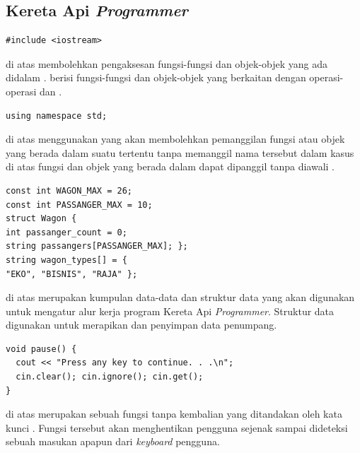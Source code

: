 \documentclass[../main.tex]{subfiles}
\begin{document}
\subsection{Kereta Api \textit{Programmer}}

\begin{code}
\begin{verbatim}
#include <iostream>
\end{verbatim}
\end{code}

{\Script} di atas membolehkan pengaksesan fungsi-fungsi dan objek-objek yang ada didalam {\header} {\file} . {\Header} {\file}  berisi fungsi-fungsi dan objek-objek yang berkaitan dengan operasi-operasi {\ioi} dan {\ioo} {\stream}.

\begin{code}
\begin{verbatim}
using namespace std;
\end{verbatim}
\end{code}

{\Script} di atas menggunakan {\statement}  yang akan membolehkan pemanggilan fungsi atau objek yang berada dalam suatu  tertentu tanpa memanggil nama  tersebut dalam kasus di atas fungsi dan objek yang berada dalam  dapat dipanggil tanpa diawali .

\begin{code}
\begin{verbatim}
const int WAGON_MAX = 26;
const int PASSANGER_MAX = 10;
struct Wagon {
int passanger_count = 0;
string passangers[PASSANGER_MAX]; };
string wagon_types[] = {
"EKO", "BISNIS", "RAJA" };
\end{verbatim}
\end{code}

{\Script} di atas merupakan kumpulan data-data dan struktur data yang akan digunakan untuk mengatur alur kerja program Kereta Api \textit{Programmer}. Struktur data  digunakan untuk merapikan dan penyimpan data penumpang.

\begin{code}
\begin{verbatim}
void pause() {
  cout << "Press any key to continue. . .\n";
  cin.clear(); cin.ignore(); cin.get();
}
\end{verbatim}
\end{code}

{\Script} di atas merupakan sebuah fungsi tanpa kembalian yang ditandakan oleh kata kunci . Fungsi tersebut akan menghentikan pengguna sejenak sampai dideteksi sebuah masukan apapun dari \textit{keyboard} pengguna.
\end{document}
